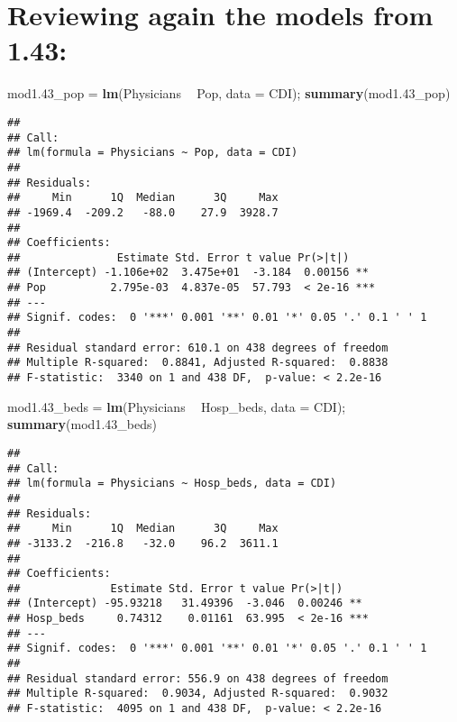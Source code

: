 \documentclass[]{article}
\newenvironment{Shaded}{\begin{snugshade}}{\end{snugshade}}
\newcommand{\DataTypeTok}[1]{\textcolor[rgb]{0.13,0.29,0.53}{#1}}
\newcommand{\FloatTok}[1]{\textcolor[rgb]{0.00,0.00,0.81}{#1}}
\newcommand{\KeywordTok}[1]{\textcolor[rgb]{0.13,0.29,0.53}{\textbf{#1}}}
\newcommand{\NormalTok}[1]{#1}
\newcommand{\OperatorTok}[1]{\textcolor[rgb]{0.81,0.36,0.00}{\textbf{#1}}}
\newcommand{\StringTok}[1]{\textcolor[rgb]{0.31,0.60,0.02}{#1}}
\begin{document}
\hypertarget{reviewing-again-the-models-from-1.43}{%
\section{Reviewing again the models from
1.43:}\label{reviewing-again-the-models-from-1.43}}

\begin{Shaded}
\begin{Highlighting}[]
\NormalTok{mod1}\FloatTok{.43}\NormalTok{_pop =}\StringTok{ }\KeywordTok{lm}\NormalTok{(Physicians }\OperatorTok{~}\StringTok{ }\NormalTok{Pop, }\DataTypeTok{data =}\NormalTok{ CDI); }\KeywordTok{summary}\NormalTok{(mod1}\FloatTok{.43}\NormalTok{_pop)}
\end{Highlighting}
\end{Shaded}

\begin{verbatim}
## 
## Call:
## lm(formula = Physicians ~ Pop, data = CDI)
## 
## Residuals:
##     Min      1Q  Median      3Q     Max 
## -1969.4  -209.2   -88.0    27.9  3928.7 
## 
## Coefficients:
##               Estimate Std. Error t value Pr(>|t|)    
## (Intercept) -1.106e+02  3.475e+01  -3.184  0.00156 ** 
## Pop          2.795e-03  4.837e-05  57.793  < 2e-16 ***
## ---
## Signif. codes:  0 '***' 0.001 '**' 0.01 '*' 0.05 '.' 0.1 ' ' 1
## 
## Residual standard error: 610.1 on 438 degrees of freedom
## Multiple R-squared:  0.8841, Adjusted R-squared:  0.8838 
## F-statistic:  3340 on 1 and 438 DF,  p-value: < 2.2e-16
\end{verbatim}

\begin{Shaded}
\begin{Highlighting}[]
\NormalTok{mod1}\FloatTok{.43}\NormalTok{_beds =}\StringTok{ }\KeywordTok{lm}\NormalTok{(Physicians }\OperatorTok{~}\StringTok{ }\NormalTok{Hosp_beds, }\DataTypeTok{data =}\NormalTok{ CDI); }\KeywordTok{summary}\NormalTok{(mod1}\FloatTok{.43}\NormalTok{_beds)}
\end{Highlighting}
\end{Shaded}

\begin{verbatim}
## 
## Call:
## lm(formula = Physicians ~ Hosp_beds, data = CDI)
## 
## Residuals:
##     Min      1Q  Median      3Q     Max 
## -3133.2  -216.8   -32.0    96.2  3611.1 
## 
## Coefficients:
##              Estimate Std. Error t value Pr(>|t|)    
## (Intercept) -95.93218   31.49396  -3.046  0.00246 ** 
## Hosp_beds     0.74312    0.01161  63.995  < 2e-16 ***
## ---
## Signif. codes:  0 '***' 0.001 '**' 0.01 '*' 0.05 '.' 0.1 ' ' 1
## 
## Residual standard error: 556.9 on 438 degrees of freedom
## Multiple R-squared:  0.9034, Adjusted R-squared:  0.9032 
## F-statistic:  4095 on 1 and 438 DF,  p-value: < 2.2e-16
\end{verbatim}
\end{document}
